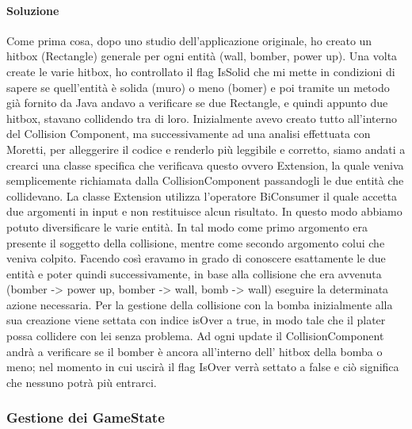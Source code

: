 \documentclass[a4paper,12pt]{report}
\begin{document}
\paragraph{Soluzione} Come prima cosa, dopo uno studio dell’applicazione originale, ho creato un hitbox (Rectangle) generale per ogni entità (wall, bomber, power up). Una volta create le varie hitbox, ho controllato il flag IsSolid che mi mette in condizioni di sapere se quell’entità è solida (muro) o meno (bomer) e poi tramite un metodo già fornito da Java andavo a verificare se due Rectangle, e quindi appunto due hitbox, stavano collidendo tra di loro. Inizialmente avevo creato tutto all’interno del Collision Component, ma successivamente ad una analisi effettuata con Moretti, per alleggerire il codice e renderlo più leggibile e corretto, siamo andati a crearci una classe specifica che verificava questo ovvero Extension, la quale veniva semplicemente richiamata dalla CollisionComponent passandogli le due entità che collidevano. La classe Extension utilizza l’operatore BiConsumer il quale accetta due argomenti in input e non restituisce alcun risultato. In questo modo abbiamo potuto diversificare le varie entità. In tal modo come primo argomento era presente il soggetto della collisione, mentre come secondo argomento colui che veniva colpito. Facendo così eravamo in grado di conoscere esattamente le due entità e poter quindi successivamente, in base alla collisione che era avvenuta (bomber -> power up, bomber -> wall, bomb -> wall) eseguire la determinata azione necessaria.
Per la gestione della collisione con la bomba inizialmente alla sua creazione viene settata con indice isOver a true, in modo tale che il plater possa collidere con lei senza problema. Ad ogni update il CollisionComponent andrà a verificare se il bomber è ancora all’interno dell’ hitbox della bomba o meno; nel momento in cui uscirà il flag IsOver verrà settato a false e ciò significa che nessuno potrà più entrarci.


\subsubsection{Gestione dei GameState}
\end{document}

